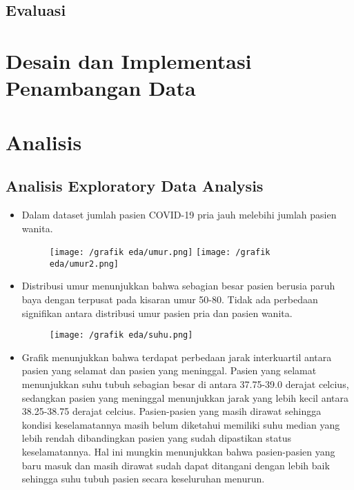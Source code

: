 \documentclass{article}
\begin{document}
   	\subsection{Evaluasi}
   \section{Desain dan Implementasi Penambangan Data}
   \section{Analisis}
    \subsection{Analisis Exploratory Data Analysis}
     \begin{itemize}
     	
	    \begin{figure}[H]
	    	\centering
	    	\texttt{[image: /grafik eda/gender.png]}
	    \end{figure}
    	\item Dalam dataset jumlah pasien COVID-19 pria jauh melebihi jumlah pasien wanita.
    	
		\begin{figure}[H]
			\centering
			\texttt{[image: /grafik eda/umur.png]}
			\texttt{[image: /grafik eda/umur2.png]}
		\end{figure}
		\item Distribusi umur menunjukkan bahwa sebagian besar pasien berusia paruh baya dengan terpusat pada kisaran umur 50-80. Tidak ada perbedaan signifikan antara distribusi umur pasien pria dan pasien wanita.
		
		\begin{figure}[H]
			\centering
			\texttt{[image: /grafik eda/suhu.png]}
		\end{figure}
		\item Grafik menunjukkan bahwa terdapat perbedaan jarak interkuartil antara pasien yang selamat dan pasien yang meninggal. Pasien yang selamat menunjukkan suhu tubuh sebagian besar di antara 37.75-39.0 derajat celcius, sedangkan pasien yang meninggal menunjukkan jarak yang lebih kecil antara 38.25-38.75 derajat celcius. Pasien-pasien yang masih dirawat sehingga kondisi keselamatannya masih belum diketahui memiliki suhu median yang lebih rendah dibandingkan pasien yang sudah dipastikan status keselamatannya. Hal ini mungkin menunjukkan bahwa pasien-pasien yang baru masuk dan masih dirawat sudah dapat ditangani dengan lebih baik sehingga suhu tubuh pasien secara keseluruhan menurun.
		

\end{itemize}
\end{document}

